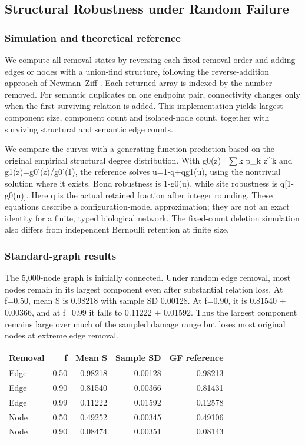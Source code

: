 \subsection{Structural Robustness under Random Failure}
\label{sec:random-failure}

\subsubsection{Simulation and theoretical
reference}\label{simulation-and-theoretical-reference}

We compute all removal states by reversing each fixed removal order and
adding edges or nodes with a union-find structure, following the
reverse-addition approach of Newman--Ziff \cite{newman2000efficient}. Each returned array
is indexed by the number removed. For semantic duplicates on one
endpoint pair, connectivity changes only when the first surviving
relation is added. This implementation yields largest-component size,
component count and isolated-node count, together with surviving
structural and semantic edge counts.

We compare the curves with a generating-function prediction based on the
original empirical structural degree distribution. With g0(z)=$\sum$k p\_k
z\^{}k and g1(z)=g0'(z)/g0'(1), the reference solves u=1-q+qg1(u), using
the nontrivial solution where it exists. Bond robustness is 1-g0(u),
while site robustness is q{[}1-g0(u){]}. Here q is the actual retained
fraction after integer rounding. These equations describe a
configuration-model approximation; they are not an exact identity for a
finite, typed biological network. The fixed-count deletion simulation
also differs from independent Bernoulli retention at finite size.

\subsubsection{Standard-graph results}\label{standard-graph-results}

The 5,000-node graph is initially connected. Under random edge removal,
most nodes remain in its largest component even after substantial
relation loss. At f=0.50, mean S is 0.98218 with sample SD 0.00128. At
f=0.90, it is 0.81540 $\pm$ 0.00366, and at f=0.99 it falls to 0.11222 $\pm$
0.01592. Thus the largest component remains large over much of the
sampled damage range but loses most original nodes at extreme edge
removal.

\begin{longtable}[]{@{}lrrrr@{}}
\toprule\noalign{}
Removal & f & Mean S & Sample SD & GF reference \\
\midrule\noalign{}
\endhead
\bottomrule\noalign{}
\endlastfoot
Edge & 0.50 & 0.98218 & 0.00128 & 0.98213 \\
Edge & 0.90 & 0.81540 & 0.00366 & 0.81431 \\
Edge & 0.99 & 0.11222 & 0.01592 & 0.12578 \\
Node & 0.50 & 0.49252 & 0.00345 & 0.49106 \\
Node & 0.90 & 0.08474 & 0.00351 & 0.08143 \\
\end{longtable}

